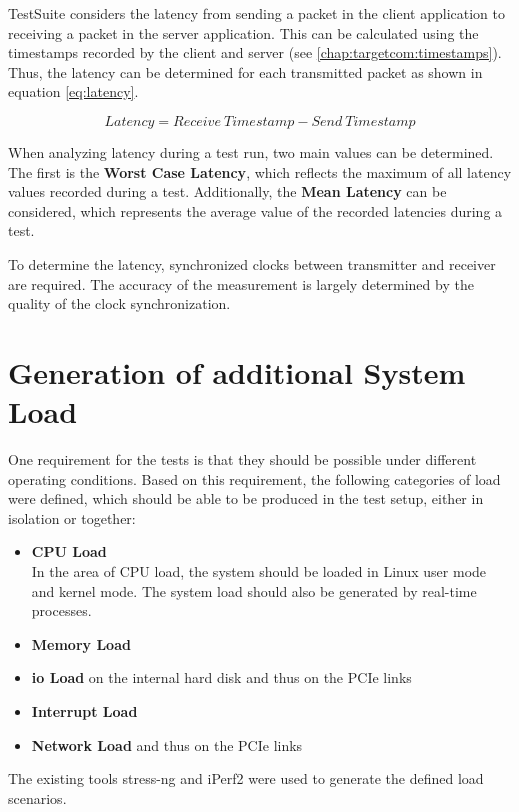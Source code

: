 TestSuite considers the latency from sending a packet in the client application to receiving a packet in the server application. This can be calculated using the timestamps recorded by the client and server (see \ref{chap:targetcom:timestamps}). Thus, the latency can be determined for each transmitted packet as shown in equation \ref{eq:latency}.

\begin{equation}
Latency = Receive\ Timestamp - Send\ Timestamp
\label{eq:latency}
\end{equation}

When analyzing latency during a test run, two main values can be determined. The first is the \textbf{Worst Case Latency}, which reflects the maximum of all latency values recorded during a test. Additionally, the \textbf{Mean Latency} can be considered, which represents the average value of the recorded latencies during a test.

To determine the latency, synchronized clocks between transmitter and receiver are required. The accuracy of the measurement is largely determined by the quality of the clock synchronization.

\clearpage
\section{Generation of additional System Load} \label{chap:loadgeneration}
One requirement for the tests is that they should be possible under different operating conditions. Based on this requirement, the following categories of load were defined, which should be able to be produced in the test setup, either in isolation or together:
\begin{itemize}
	\item \textbf{\ac{CPU} Load} \\
		In the area of \ac{CPU} load, the system should be loaded in Linux user mode and kernel mode. The system load should also be generated by real-time processes.
	\item \textbf{Memory Load}
	\item \textbf{\ac{io} Load} on the internal hard disk and thus on the PCIe links
	\item \textbf{Interrupt Load}
	\item \textbf{Network Load} and thus on the PCIe links
\end{itemize}

The existing tools stress-ng and iPerf2 were used to generate the defined load scenarios.

